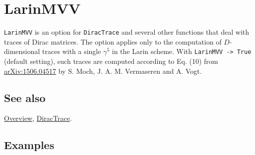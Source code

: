 \documentclass[../FeynCalcManual.tex]{subfiles}
\begin{document}
\hypertarget{larinmvv}{%
\section{LarinMVV}\label{larinmvv}}

\texttt{LarinMVV} is an option for \texttt{DiracTrace} and several other
functions that deal with traces of Dirac matrices. The option applies
only to the computation of \(D\)-dimensional traces with a single
\(\gamma ^5\) in the Larin scheme. With \texttt{LarinMVV -> True}
(default setting), such traces are computed according to Eq. (10) from
\href{https://arxiv.org/pdf/1506.04517.pdf}{arXiv:1506.04517} by S.
Moch, J. A. M. Vermaseren and A. Vogt.

\subsection{See also}

\hyperlink{toc}{Overview}, \hyperlink{diractrace}{DiracTrace}.

\subsection{Examples}
\end{document}
